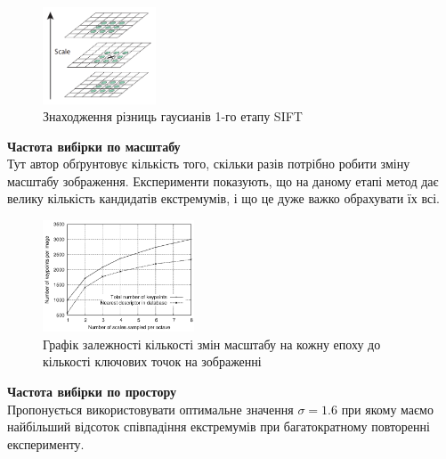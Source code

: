 \begin{enumerate}
                \begin{figure}[H]
                    \centering
                    \includegraphics[width=0.3\textwidth]{images/sift2}
                    \caption{Знаходження різниць гаусианів 1-го етапу SIFT}
                    \label{fig:swift2}
                \end{figure}

        \subitem \textbf{Частота вибірки по масштабу} \\
                Тут автор обґрунтовує кількість того, скільки разів потрібно робити 
                зміну масштабу зображення. Експерименти показують, що на даному етапі метод дає
                велику кількість кандидатів екстремумів, і що це дуже важко обрахувати їх всі.
                \begin{figure}[H]
                    \centering
                    \includegraphics[width=0.4\textwidth]{images/sift3}
                    \caption{Графік залежності кількості змін масштабу на кожну епоху до 
                            кількості ключових точок на зображенні}
                    \label{fig:swift3}
                \end{figure}

        \subitem \textbf{Частота вибірки по простору} \\
                Пропонується використовувати оптимальне значення $\sigma = 1.6$ при якому 
                маємо найбільший відсоток співпадіння екстремумів при багатократному повторенні
                експерименту.


\end{enumerate}
